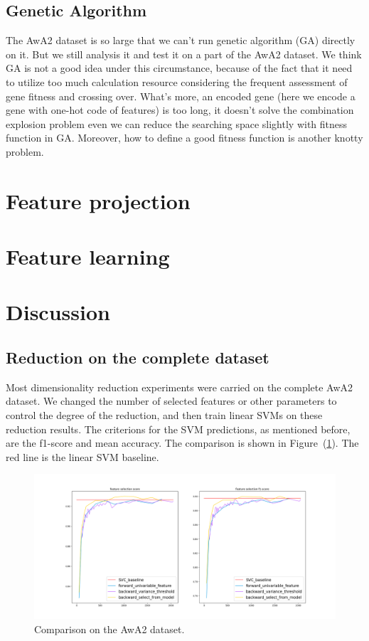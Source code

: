 \documentclass{article}
\begin{document}
\subsection{Genetic Algorithm}
The AwA2 dataset is so large that we can't run genetic algorithm (GA) directly on it. But we still analysis it and test it on a part of the AwA2 dataset. We think GA is not a good idea under this circumstance, because of the fact that it need to utilize too much calculation resource considering the frequent assessment of gene fitness and crossing over. What's more, an encoded gene (here we encode a gene with one-hot code of features) is too long, it doesn't solve the combination explosion problem even we can reduce the searching space slightly with fitness function in GA. Moreover, how to define a good fitness function is another knotty problem.


\section{Feature projection}
\label{sec:projection}

\section{Feature learning}
\label{sec:learning}

\section{Discussion}
\label{sec:discussion}
\subsection{Reduction on the complete dataset}
Most dimensionality reduction experiments were carried on the complete AwA2 dataset. We changed the number of selected features or other parameters to control the degree of the reduction, and then train linear SVMs on these reduction results. The criterions for the SVM predictions, as mentioned before, are the f1-score and mean accuracy. The comparison is shown in Figure~(\ref{fig:complete}). The red line is the linear SVM baseline.
  \begin{figure}
  	\label{fig:complete}
  	\caption{Comparison on the AwA2 dataset.}
  	\includegraphics[width=\linewidth]{figs/feature_selection.png}
  \end{figure}
\end{document}

